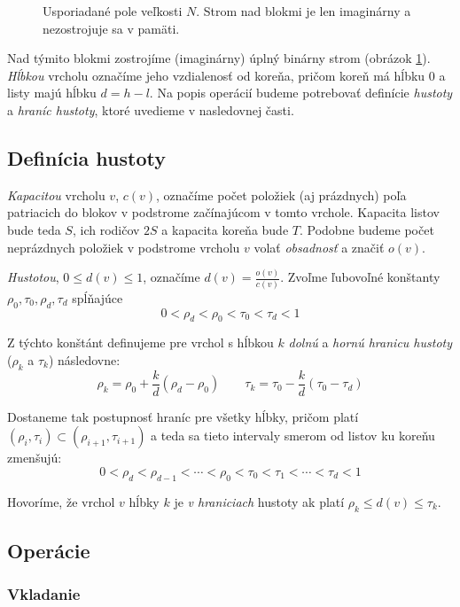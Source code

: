 \begin{figure}
    \centering
    \resizebox{0.8\textwidth}{!}{
        
    }
    \caption[Usporiadané pole]{Usporiadané pole veľkosti $N$. Strom nad blokmi je len imaginárny a nezostrojuje sa v pamäti.}
    \label{fig:of_overview}
\end{figure}

Nad týmito blokmi zostrojíme (imaginárny) úplný binárny strom (obrázok \ref{fig:of_overview}). \emph{Hĺbkou} vrcholu označíme jeho vzdialenosť od koreňa, pričom koreň má hĺbku $0$ a listy majú hĺbku $d = h-l$. Na popis operácií budeme potrebovať definície \emph{hustoty} a \emph{hraníc hustoty}, ktoré uvedieme v nasledovnej časti.

\subsection{Definícia hustoty}

\emph{Kapacitou} vrcholu $v$, $c(v)$, označíme počet položiek (aj prázdnych) poľa patriacich do blokov v podstrome začínajúcom v tomto vrchole. Kapacita listov bude teda $S$, ich rodičov $2S$ a kapacita koreňa bude $T$. Podobne budeme počet neprázdnych položiek v podstrome vrcholu $v$ volať \emph{obsadnosť} a značiť $o(v)$. 

\emph{Hustotou}, $0 \le d(v) \le 1$, označíme $d(v) = \frac{o(v)}{c(v)}$. Zvoľme ľubovoľné konštanty $\rho_0, \tau_0, \rho_d, \tau_d$ spĺňajúce
\[
0 < \rho_d < \rho_0 < \tau_0 < \tau_d < 1
\]

Z týchto konštánt definujeme pre vrchol s hĺbkou $k$ \emph{dolnú} a \emph{hornú hranicu hustoty} ($\rho_k$ a $\tau_k$) následovne:
\[
\rho_k = \rho_0 + \frac{k}{d}(\rho_d-\rho_0) \qquad
\tau_k = \tau_0 - \frac{k}{d}(\tau_0-\tau_d)
\]

Dostaneme tak postupnosť hraníc pre všetky hĺbky, pričom platí $(\rho_i,\tau_i) \subset (\rho_{i+1},\tau_{i+1})$ a teda sa tieto intervaly smerom od listov ku koreňu zmenšujú:
\[
0 < \rho_d < \rho_{d-1} < \cdots < \rho_0 < \tau_0 < \tau_1 < \cdots < \tau_d < 1
\]

Hovoríme, že vrchol $v$ hĺbky $k$ je \emph{v hraniciach} hustoty ak platí $\rho_k \le d(v) \le \tau_k$.

\subsection{Operácie}
\subsubsection{Vkladanie}

